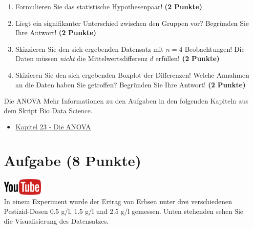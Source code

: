 \documentclass[a4paper, 10pt]{scrartcl}\usepackage[]{graphicx}\usepackage[]{xcolor}
\begin{document}
\begin{enumerate}
  \item Formulieren Sie das statistische Hypothesenpaar! \textbf{(2
Punkte)}
\item Liegt ein signifikanter Unterschied zwischen den Gruppen vor?
  Begr{\"u}nden Sie Ihre Antwort! \textbf{(2 Punkte)}
\item Skizzieren Sie den sich ergebenden Datensatz mit $n = 4$
  Beobachtungen! Die Daten m{\"u}ssen \textit{nicht} die Mittelwertsdifferenz
  $d$ erf{\"u}llen! \textbf{(2 Punkte)} 
\item Skizieren Sie den sich ergebenden Boxplot der Differenzen! Welche Annahmen an die Daten haben Sie getroffen? Begr{\"u}nden Sie Ihre Antwort! \textbf{(2 Punkte)} 
\end{enumerate}
 
\clearpage
\begin{graybox}{Die ANOVA}
Mehr Informationen zu den Aufgaben in den folgenden Kapiteln aus dem Skript Bio Data Science.
  \begin{itemize}
  \item \href{https://jkruppa.github.io/stat-tests-anova.html}{Kapitel 23 - Die ANOVA}
  \end{itemize}
\end{graybox}
\clearpage

\section{Aufgabe \hfill (8 Punkte)}

\hfill\href{https://youtu.be/Q7xtQJoOmQI}{\includegraphics[width =
  2cm]{img/youtube}}\\[1Ex]

In einem Experiment wurde der Ertrag von Erbsen unter drei verschiedenen
Pestizid-Dosen 0.5 g/l, 1.5 g/l und 2.5 g/l gemessen. Unten stehenden sehen
Sie die Visualisierung des Datensatzes.
\end{document}
